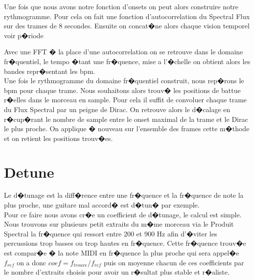 \documentclass[12pt]{article}
\begin{document}
Une fois que nous avons notre fonction d'onsets on peut alors construire notre rythmogramme. Pour cela on fait une fonction d'autocorrelation du Spectral Flux sur des trames de 8 secondes. Ensuite on concat�ne alors chaque vision temporel voir p�riode

Avec une  FFT � la place d'une autocorrelation on se retrouve dans le domaine fr�quentiel, le tempo �tant une fr�quence, mise a l'�chelle on obtient alors les bandes repr�sentant les bpm.\\


Une fois le rythmogramme du domaine fr�quentiel construit, nous rep�rons le bpm pour chaque trame. Nous souhaitons alors trouv� les positions de battue r�elles dans le morceau en sample. Pour cela il suffit de convoluer chaque trame du Flux Spectral par un peigne de Dirac. On retrouve alors le d�calage en r�cup�rant le nombre de sample entre le onset maximal de la trame et le Dirac le plus proche.
On applique � nouveau sur l'ensemble des frames cette m�thode et on retient les positions trouv�es.

\section{Detune}
Le d�tunage est la diff�rence entre une fr�quence et la fr�quence de note la plus proche, une guitare mal accord� est d�tun� par exemple.\\
Pour ce faire nous avons cr�e un coefficient de d�tunage, le calcul est simple.\\
Nous trouvons sur plusieurs petit extraits du m�me morceau via le Produit Spectral la fr�quence qui ressort  entre 200 et 900 Hz afin d'�viter les percussions trop basses ou trop hautes en fr�quence. Cette fr�quence trouv�e est compar�e � la note MIDI en fr�quence la plus proche qui sera appel�e $f_{ref}$ on a donc $coef = f_{trouve}/f_{ref}$ puis on moyenne chacun de ces coefficients par le nombre d'extraits choisis pour avoir un r�sultat plus stable et r�aliste.

\end{document}
